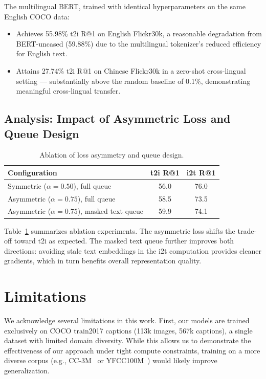 \documentclass[10pt,leqno]{amsart}
\begin{document}
The multilingual BERT, trained with identical hyperparameters on the same English COCO data:
\begin{itemize}
    \item Achieves 55.98\% t2i R@1 on English Flickr30k, a reasonable degradation from BERT-uncased (59.88\%) due to the multilingual tokenizer's reduced efficiency for English text.
    \item Attains 27.74\% t2i R@1 on Chinese Flickr30k in a zero-shot cross-lingual setting --- substantially above the random baseline of 0.1\%, demonstrating meaningful cross-lingual transfer.
\end{itemize}

\subsection{Analysis: Impact of Asymmetric Loss and Queue Design}

\begin{table}[h]
\centering
\begin{tabular}{lcc}
\toprule
Configuration & t2i R@1 & i2t R@1 \\
\midrule
Symmetric ($\alpha = 0.50$), full queue & 56.0 & 76.0 \\
Asymmetric ($\alpha = 0.75$), full queue & 58.5 & 73.5 \\
Asymmetric ($\alpha = 0.75$), masked text queue & 59.9 & 74.1 \\
\bottomrule
\end{tabular}
\caption{Ablation of loss asymmetry and queue design.}
\label{tab:ablation}
\end{table}

Table~\ref{tab:ablation} summarizes ablation experiments. The asymmetric loss shifts the trade-off toward t2i as expected. The masked text queue further improves both directions: avoiding stale text embeddings in the i2t computation provides cleaner gradients, which in turn benefits overall representation quality.

\section{Limitations}

We acknowledge several limitations in this work. First, our models are trained exclusively on COCO train2017 captions (113k images, 567k captions), a single dataset with limited domain diversity. While this allows us to demonstrate the effectiveness of our approach under tight compute constraints, training on a more diverse corpus (e.g., CC-3M~\citep{sharma2018conceptual} or YFCC100M~\citep{thomee2016yfcc100m}) would likely improve generalization.
\end{document}
